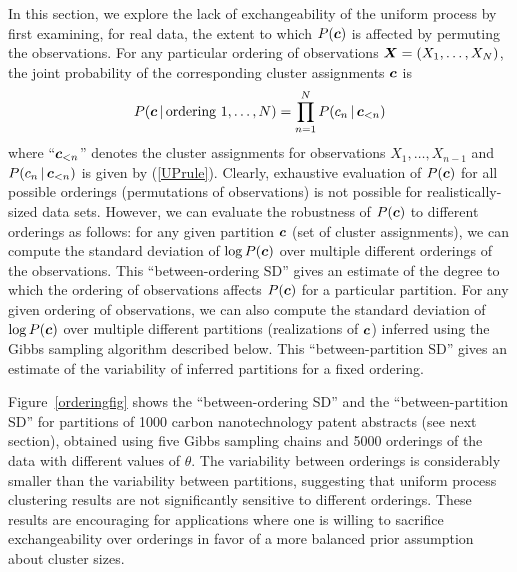 \documentclass[twoside]{article}
\begin{document}
In this section, we explore the lack of exchangeability of the uniform
process by first examining, for real data, the extent to which
$P(\boldsymbol{c})$ is affected by permuting the observations. For any particular
ordering of observations $\boldsymbol{X} = (X_1, \ldots, X_N)$, the joint
probability of the corresponding cluster assignments $\boldsymbol{c}$ is
\begin{equation}
P(\boldsymbol{c} \,|\, \textrm{ordering $1, \ldots, N$}) = \prod_{n=1}^N P(c_n \,|\,
\boldsymbol{c}_{<n})
\end{equation}
where ``$\boldsymbol{c}_{<n}$'' denotes the cluster assignments for observations
$X_1, \ldots, X_{n-1}$ and $P(c_n \,|\, \boldsymbol{c}_{<n})$ is given by
(\ref{UPrule}). Clearly, exhaustive evaluation of $P(\boldsymbol{c})$ for all
possible orderings (permutations of observations) is not possible for
realistically-sized data sets. However, we can evaluate the robustness
of $P(\boldsymbol{c})$ to different orderings as follows: for any given partition
$\boldsymbol{c}$ (set of cluster assignments), we can compute the standard
deviation of $\log P(\boldsymbol{c})$ over multiple different orderings of the
observations. This ``between-ordering SD'' gives an estimate of the
degree to which the ordering of observations affects $P(\boldsymbol{c})$ for a
particular partition. For any given ordering of observations, we can
also compute the standard deviation of $\log{P(\boldsymbol{c})}$ over multiple
different partitions (realizations of $\boldsymbol{c}$) inferred using the Gibbs
sampling algorithm described below. This ``between-partition SD''
gives an estimate of the variability of inferred partitions for a
fixed ordering.

Figure~\ref{orderingfig} shows the ``between-ordering SD'' and the
``between-partition SD'' for partitions of 1000 carbon nanotechnology
patent abstracts (see next section), obtained using five Gibbs
sampling chains and 5000 orderings of the data with different values
of $\theta$.  The variability between orderings is considerably
smaller than the variability between partitions, suggesting that
uniform process clustering results are not significantly sensitive to
different orderings. These results are encouraging for applications
where one is willing to sacrifice exchangeability over orderings in
favor of a more balanced prior assumption about cluster sizes.
\end{document}
